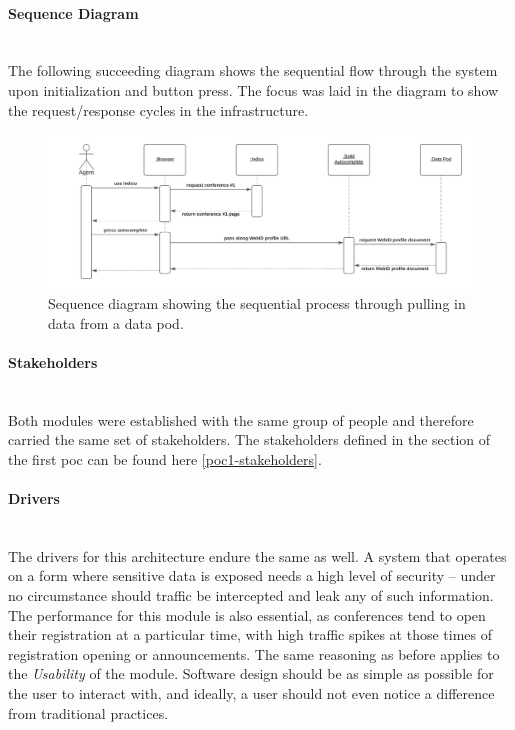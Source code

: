 \paragraph{Sequence Diagram}\mbox{}\\

The following succeeding diagram shows the sequential flow through the system upon initialization and button press. The focus was laid in the diagram to show the request/response cycles in the infrastructure. 

\begin{figure}[H]
    \centering
    \includegraphics[width=\textwidth]{prototype/graphs/poc-conference_registration-autocomplete-sequence_diagram.png}
    \caption{Sequence diagram showing the sequential process through pulling in data from a data pod.}
    \label{fig:poc-conference_registration-autocomplete-sequence_diagram}
\end{figure}

\vspace{0.5cm}
\paragraph{Stakeholders}\mbox{}\\

Both modules were established with the same group of people and therefore carried the same set of stakeholders. The stakeholders defined in the section of the first \gls{poc} can be found here \ref{poc1-stakeholders}.
\vspace{0.5cm}
\paragraph{Drivers}\mbox{}\\

The drivers for this architecture endure the same as well. A system that operates on a form where sensitive data is exposed needs a high level of security -- under no circumstance should traffic be intercepted and leak any of such information. The performance for this module is also essential, as conferences tend to open their registration at a particular time, with high traffic spikes at those times of registration opening or announcements. The same reasoning as before applies to the \textit{Usability} of the module. Software design should be as simple as possible for the user to interact with, and ideally, a user should not even notice a difference from traditional practices.

